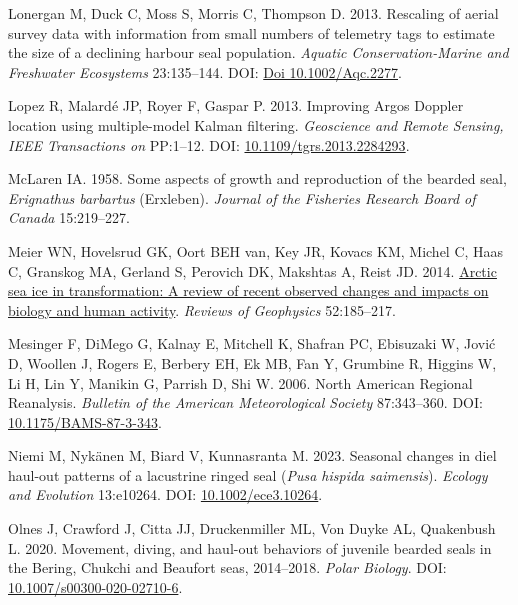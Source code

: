 \documentclass[fleqn,10pt,lineno]{wlpeerj} %
\newlength{\cslhangindent}
\newlength{\cslentryspacingunit} %
\newenvironment{CSLReferences}[2] %
 {%
  \setlength{\parindent}{0pt}
  \ifodd #1
  \let\oldpar\par
  \def\par{\hangindent=\cslhangindent\oldpar}
  \fi
  \setlength{\parskip}{#2\cslentryspacingunit}
 }%
 {}
\begin{document}
\begin{CSLReferences}{1}{0}
\leavevmode{}%
Lonergan M, Duck C, Moss S, Morris C, Thompson D. 2013. Rescaling of aerial survey data with information from small numbers of telemetry tags to estimate the size of a declining harbour seal population. \emph{Aquatic Conservation-Marine and Freshwater Ecosystems} 23:135--144. DOI: \href{https://doi.org/Doi\%2010.1002/Aqc.2277}{Doi 10.1002/Aqc.2277}.

\leavevmode{}%
Lopez R, Malardé JP, Royer F, Gaspar P. 2013. Improving Argos Doppler location using multiple-model Kalman filtering. \emph{Geoscience and Remote Sensing, IEEE Transactions on} PP:1--12. DOI: \href{https://doi.org/10.1109/tgrs.2013.2284293}{10.1109/tgrs.2013.2284293}.

\leavevmode{}%
McLaren IA. 1958. Some aspects of growth and reproduction of the bearded seal, \emph{Erignathus barbartus} (Erxleben). \emph{Journal of the Fisheries Research Board of Canada} 15:219--227.

\leavevmode{}%
Meier WN, Hovelsrud GK, Oort BEH van, Key JR, Kovacs KM, Michel C, Haas C, Granskog MA, Gerland S, Perovich DK, Makshtas A, Reist JD. 2014. \href{https://agupubs.onlinelibrary.wiley.com/doi/abs/10.1002/2013RG000431}{Arctic sea ice in transformation: A review of recent observed changes and impacts on biology and human activity}. \emph{Reviews of Geophysics} 52:185--217.

\leavevmode{}%
Mesinger F, DiMego G, Kalnay E, Mitchell K, Shafran PC, Ebisuzaki W, Jović D, Woollen J, Rogers E, Berbery EH, Ek MB, Fan Y, Grumbine R, Higgins W, Li H, Lin Y, Manikin G, Parrish D, Shi W. 2006. North American Regional Reanalysis. \emph{Bulletin of the American Meteorological Society} 87:343--360. DOI: \href{https://doi.org/10.1175/BAMS-87-3-343}{10.1175/BAMS-87-3-343}.

\leavevmode{}%
Niemi M, Nykänen M, Biard V, Kunnasranta M. 2023. Seasonal changes in diel haul-out patterns of a lacustrine ringed seal (\emph{Pusa hispida saimensis}). \emph{Ecology and Evolution} 13:e10264. DOI: \href{https://doi.org/10.1002/ece3.10264}{10.1002/ece3.10264}.

\leavevmode{}%
Olnes J, Crawford J, Citta JJ, Druckenmiller ML, Von Duyke AL, Quakenbush L. 2020. Movement, diving, and haul-out behaviors of juvenile bearded seals in the Bering, Chukchi and Beaufort seas, 2014--2018. \emph{Polar Biology}. DOI: \href{https://doi.org/10.1007/s00300-020-02710-6}{10.1007/s00300-020-02710-6}.


\end{CSLReferences}
\end{document}
